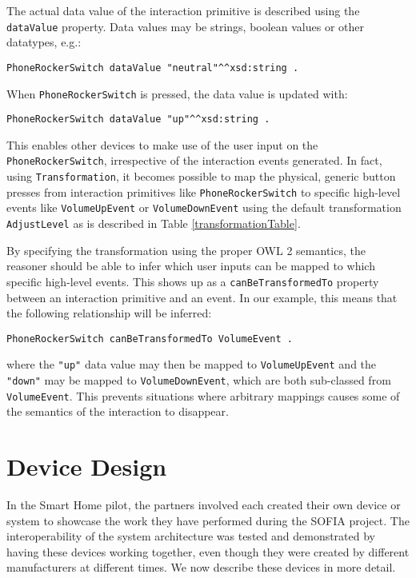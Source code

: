 The actual data value of the interaction primitive is described using the \texttt{dataValue} property. Data values may be strings, boolean values or other datatypes, e.g.:

\begin{verbatim}
PhoneRockerSwitch dataValue "neutral"^^xsd:string .
\end{verbatim}

When \texttt{PhoneRockerSwitch} is pressed, the data value is updated with:

\begin{verbatim}
PhoneRockerSwitch dataValue "up"^^xsd:string .
\end{verbatim}

This enables other devices to make use of the user input on the \texttt{PhoneRockerSwitch}, irrespective of the interaction events generated. In fact, using \texttt{Transformation}, it becomes possible to map the physical, generic button presses from interaction primitives like \texttt{Phone\-Rocker\-Switch} to specific high-level events like \texttt{VolumeUpEvent} or
\texttt{Volume\-Down\-Event} using the default transformation \texttt{AdjustLevel} as is described in Table \ref{transformationTable}.

By specifying the transformation using the proper \ac{OWL} 2 semantics, the reasoner should be able to infer which user inputs can be mapped to which specific high-level events. This shows up as a \texttt{canBeTransformedTo} property between an interaction primitive and an event. In our example, this means that the following relationship will be inferred:

\begin{verbatim}
PhoneRockerSwitch canBeTransformedTo VolumeEvent .
\end{verbatim}

\noindent
where the \texttt{"up"} data value may then be mapped to \texttt{Volume\-Up\-Event} and the \texttt{"down"} may be mapped to \texttt{VolumeDownEvent}, which are both sub-classed from \texttt{VolumeEvent}. This prevents situations where arbitrary mappings causes some of the semantics of the interaction to disappear.


\section{Device Design}

In the Smart Home pilot, the partners involved each created their own device or system to showcase the work they have performed during the \ac{SOFIA} project. The interoperability of the system architecture was tested and demonstrated by having these devices working together, even though they were created by different manufacturers at different times. We now describe these devices in more detail.

